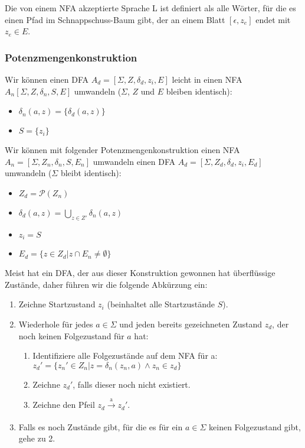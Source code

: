Die von einem NFA akzeptierte Sprache L ist definiert als alle Wörter,
für die es einen Pfad im Schnappschuss-Baum gibt,
der an einem Blatt $[\epsilon, z_e]$ endet mit $z_e \in E$.

\subsubsection{Potenzmengenkonstruktion}
Wir können einen DFA $A_d = [\Sigma, Z, \delta_d, z_i, E]$
leicht in einen NFA $A_n [\Sigma, Z, \delta_n, S, E]$ umwandeln
($\Sigma$, $Z$ und $E$ bleiben identisch):
\begin{itemize}
    \item $\delta_n(a, z) = \{\delta_d(a,z)\}$
    \item $S = \{z_i\}$
\end{itemize}

Wir können mit folgender Potenzmengenkonstruktion
einen NFA $A_n =  [\Sigma, Z_n, \delta_n, S, E_n]$ umwandeln
einen DFA $A_d = [\Sigma, Z_d, \delta_d, z_i, E_d]$
umwandeln
($\Sigma$ bleibt identisch):
\begin{itemize}
    \item $Z_d = \mathcal{P}(Z_n)$
    \item $\delta_d(a, z) = \bigcup\limits_{z \in Z'} \delta_n(a, z)$
    \item $z_i = S$
    \item $E_d = \{z \in Z_d| z \cap E_n \neq \emptyset \}$
\end{itemize}

Meist hat ein DFA,
der aus dieser Konstruktion gewonnen hat überflüssige Zustände,
daher führen wir die folgende Abkürzung ein:
\begin{enumerate}
    \item Zeichne Startzustand $z_i$ (beinhaltet alle Startzustände $S$).
    \item Wiederhole für jedes $a \in \Sigma$ und jeden bereits gezeichneten Zustand $z_d$,
        der noch keinen Folgezustand für $a$ hat:
        \begin{enumerate}
            \item Identifiziere alle Folgezustände auf dem NFA für a:\\
                $z_d' = \{z_n' \in Z_n| z = \delta_n(z_n,a) \wedge z_n \in z_d\}$\\
            \item Zeichne $z_d'$, falls dieser noch nicht existiert.
            \item Zeichne den Pfeil $z_d \xrightarrow[]{\text{a}} z_d'$.
        \end{enumerate}
    \item Falls es noch Zustände gibt, für die es für ein $a \in \Sigma$ keinen Folgezustand gibt,
        gehe zu 2.
\end{enumerate}


